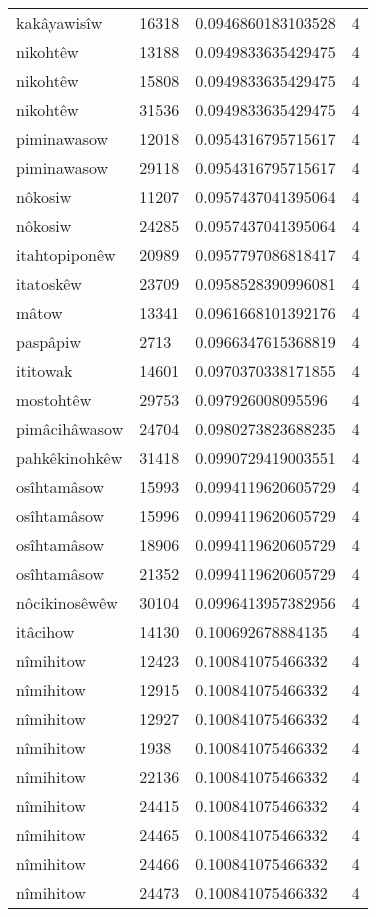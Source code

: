 \begin{longtable}{llll}
kakâyawisîw & 16318 & 0.0946860183103528 & 4 \\
nikohtêw & 13188 & 0.0949833635429475 & 4 \\
nikohtêw & 15808 & 0.0949833635429475 & 4 \\
nikohtêw & 31536 & 0.0949833635429475 & 4 \\
piminawasow & 12018 & 0.0954316795715617 & 4 \\
piminawasow & 29118 & 0.0954316795715617 & 4 \\
nôkosiw & 11207 & 0.0957437041395064 & 4 \\
nôkosiw & 24285 & 0.0957437041395064 & 4 \\
itahtopiponêw & 20989 & 0.0957797086818417 & 4 \\
itatoskêw & 23709 & 0.0958528390996081 & 4 \\
mâtow & 13341 & 0.0961668101392176 & 4 \\
paspâpiw & 2713 & 0.0966347615368819 & 4 \\
ititowak & 14601 & 0.0970370338171855 & 4 \\
mostohtêw & 29753 & 0.097926008095596 & 4 \\
pimâcihâwasow & 24704 & 0.0980273823688235 & 4 \\
pahkêkinohkêw & 31418 & 0.0990729419003551 & 4 \\
osîhtamâsow & 15993 & 0.0994119620605729 & 4 \\
osîhtamâsow & 15996 & 0.0994119620605729 & 4 \\
osîhtamâsow & 18906 & 0.0994119620605729 & 4 \\
osîhtamâsow & 21352 & 0.0994119620605729 & 4 \\
nôcikinosêwêw & 30104 & 0.0996413957382956 & 4 \\
itâcihow & 14130 & 0.100692678884135 & 4 \\
nîmihitow & 12423 & 0.100841075466332 & 4 \\
nîmihitow & 12915 & 0.100841075466332 & 4 \\
nîmihitow & 12927 & 0.100841075466332 & 4 \\
nîmihitow & 1938 & 0.100841075466332 & 4 \\
nîmihitow & 22136 & 0.100841075466332 & 4 \\
nîmihitow & 24415 & 0.100841075466332 & 4 \\
nîmihitow & 24465 & 0.100841075466332 & 4 \\
nîmihitow & 24466 & 0.100841075466332 & 4 \\
nîmihitow & 24473 & 0.100841075466332 & 4 \\

\end{longtable}
